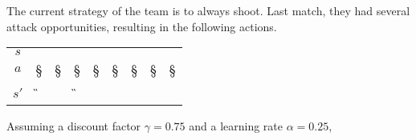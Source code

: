 \documentclass[11pt, a4paper]{article}
\begin{document}
The current strategy of the team is to always shoot. Last match, they had several attack opportunities, resulting in the following actions.

\begin{table}[h]
    \centering
    \begin{tabular}{c|cccccccc}
        \toprule
         $s$ & \C & \C & \C & \C & \A & \A & \A & \A \\
         $a$ & \S & \S & \S & \S & \S & \S & \S & \S \\
         $s'$ & \G & \C & \G & \F & \F & \C & \F & \F \\
         \bottomrule
    \end{tabular}
\end{table}

Assuming a discount factor $\gamma = 0.75$ and a learning rate $\alpha = 0.25$,
\end{document}
